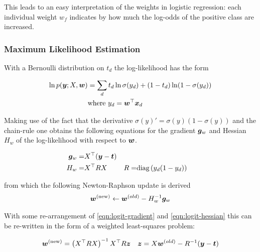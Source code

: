 This leads to an easy interpretation of the weights in logistic regression: each individual weight $w_f$ indicates by how much the log-odds of the positive class are increased.



\subsubsection*{Maximum Likelihood Estimation}
With a Bernoulli distribution on $t_d$ the log-likelihood has the form

\begin{equation}
\begin{aligned}
\ln p(\bm y; X, \bm w) & = \sum_d t_d \ln \sigma(y_d) + (1 - t_d) \ln (1 - \sigma(y_d)) \\
& \text{where } y_d = \bm w^\top\bm x_d
\end{aligned}
\end{equation}

Making use of the fact that the derivative $\sigma(y)' = \sigma(y)(1 - \sigma(y))$ and the chain-rule one obtains the following equations for the gradient $\bm g_w$ and Hessian $H_w$ of the log-likelihood with respect to $\bm w$.

\begin{align}
\bm g_w = & X^\top (\bm y - \bm t) \label{eqn:logit-gradient}\\
H_w      = & X^\top R X & R = & \text{diag} \left( {y_d (1 - y_d)} \right) \label{eqn:logit-hessian}
\end{align}

from which the following Newton-Raphson update is derived
\begin{align}
\bm w^{(\text{new})} \leftarrow \bm w^{(old)} - H_w^{-1} \bm g_w
\end{align}

With some re-arrangement of \eqref{eqn:logit-gradient} and \eqref{eqn:logit-hessian} this can be re-written in the form of a weighted least-squares problem:

\begin{align}
\bm w^{(\text{new})} & = \left(X^\top R X \right)^{-1} X^\top R \bm z & \bm z = X \bm w^{(old)}-R^{-1}(\bm y - \bm t)
\end{align}


